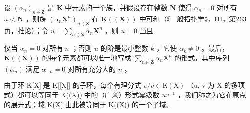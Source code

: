 设 \((\alpha_{n})_{n\in \mathbf{Z}}\) 是 \(\mathbf{K}\) 中元素的一个族，并假设存在整数 \(\mathbf{N}\) 使得 \(\alpha_{n} = 0\) 对所有 \(n < \mathbf{N}\) 。则族 \((\alpha_{n}\mathbf{X}^{n})_{n\in \mathbf{Z}}\) 在 \(\mathbf{K}((\mathbf{X}))\) 中可和（《一般拓扑学》，III，第263页，推论）；令 \(u = \sum_{n\in \mathbf{Z}}\alpha_n\mathbf{X}^n\) ，则 \(u = 0\) 当且

仅当 \(\alpha_{n} = 0\) 对所有 \(n\) ；否则 \(u\) 的阶是最小整数 \(k\) ，它使 \(\alpha_{k} \neq 0\) 。最后，\(\mathbf{K}((\mathbf{X}))\) 的每个元素都可以唯一地写成 \(\sum_{n \in \mathbf{Z}} \alpha_{n} \mathbf{X}^{n}\) 的形式，其中序列 \((\alpha_{n})\) 满足 \(\alpha_{-n} = 0\) 对所有充分大的 \(n\) 。

由于环 K{[}X{]} 是 K{[}{[}X{]}{]} 的子环，每个有理分式 \(u/v \in \mathrm{K}(\mathrm{X})\) （u, v 为 X 的多项式）都可以等同于 K((X)) 中的（广义）形式幂级数 \(uv^{-1}\) ，我们称之为它在原点的展开式；域 K(X) 由此被等同于 K((X)) 的一个子域。

